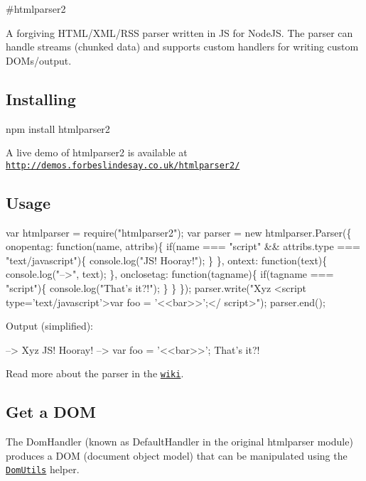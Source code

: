 \#htmlparser2 \href{https://npmjs.org/package/htmlparser2}{\tt } \href{http://travis-ci.org/fb55/htmlparser2}{\tt } \href{https://david-dm.org/fb55/htmlparser2}{\tt }

A forgiving H\+T\+M\+L/\+X\+M\+L/\+R\+SS parser written in JS for Node\+JS. The parser can handle streams (chunked data) and supports custom handlers for writing custom D\+O\+Ms/output.

\subsection*{Installing}

npm install htmlparser2

A live demo of htmlparser2 is available at \href{http://demos.forbeslindesay.co.uk/htmlparser2/}{\tt http\+://demos.\+forbeslindesay.\+co.\+uk/htmlparser2/}

\subsection*{Usage}


\begin{DoxyCode}
var htmlparser = require("htmlparser2");
var parser = new htmlparser.Parser(\{
    onopentag: function(name, attribs)\{
        if(name === "script" && attribs.type === "text/javascript")\{
            console.log("JS! Hooray!");
        \}
    \},
    ontext: function(text)\{
        console.log("-->", text);
    \},
    onclosetag: function(tagname)\{
        if(tagname === "script")\{
            console.log("That's it?!");
        \}
    \}
\});
parser.write("Xyz <script type='text/javascript'>var foo = '<<bar>>';</ script>");
parser.end();
\end{DoxyCode}


Output (simplified)\+:


\begin{DoxyCode}
--> Xyz 
JS! Hooray!
--> var foo = '<<bar>>';
That's it?!
\end{DoxyCode}


Read more about the parser in the \href{https://github.com/fb55/htmlparser2/wiki/Parser-options}{\tt wiki}.

\subsection*{Get a D\+OM}

The {\ttfamily Dom\+Handler} (known as {\ttfamily Default\+Handler} in the original {\ttfamily htmlparser} module) produces a D\+OM (document object model) that can be manipulated using the \href{https://github.com/fb55/DomUtils}{\tt {\ttfamily Dom\+Utils}} helper.

